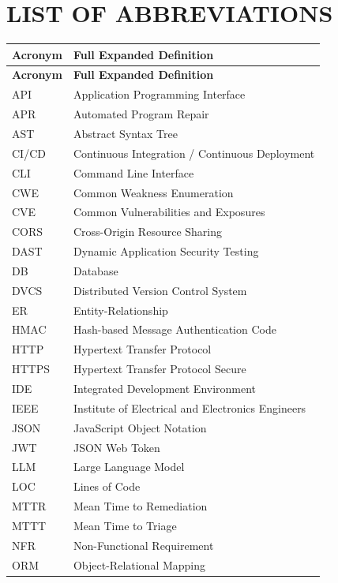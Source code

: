 \chapter*{LIST OF ABBREVIATIONS}

\begin{longtable}{p{} p{}}
\toprule
\textbf{Acronym} & \textbf{Full Expanded Definition} \\
\midrule
\endfirsthead
\toprule
\textbf{Acronym} & \textbf{Full Expanded Definition} \\
\midrule
\endhead
\bottomrule
\endfoot
\bottomrule
\endlastfoot

API & Application Programming Interface \\
APR & Automated Program Repair \\
AST & Abstract Syntax Tree \\
CI/CD & Continuous Integration / Continuous Deployment \\
CLI & Command Line Interface \\
CWE & Common Weakness Enumeration \\
CVE & Common Vulnerabilities and Exposures \\
CORS & Cross-Origin Resource Sharing \\
DAST & Dynamic Application Security Testing \\
DB & Database \\
DVCS & Distributed Version Control System \\
ER & Entity-Relationship \\
HMAC & Hash-based Message Authentication Code \\
HTTP & Hypertext Transfer Protocol \\
HTTPS & Hypertext Transfer Protocol Secure \\
IDE & Integrated Development Environment \\
IEEE & Institute of Electrical and Electronics Engineers \\
JSON & JavaScript Object Notation \\
JWT & JSON Web Token \\
LLM & Large Language Model \\
LOC & Lines of Code \\
MTTR & Mean Time to Remediation \\
MTTT & Mean Time to Triage \\
NFR & Non-Functional Requirement \\
ORM & Object-Relational Mapping \\

\end{longtable}

